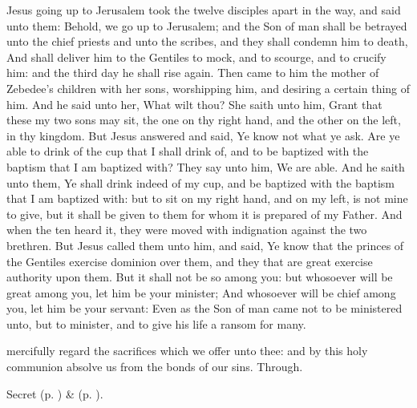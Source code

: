  Jesus going up to Jerusalem took the twelve disciples apart in the way, and said unto them: Behold, we go up to Jerusalem; and the Son of man shall be betrayed unto the chief priests and unto the scribes, and they shall condemn him to death, And shall deliver him to the Gentiles to mock, and to scourge, and to crucify him: and the third day he shall rise again. Then came to him the mother of Zebedee's children with her sons, worshipping him, and desiring a certain thing of him. And he said unto her, What wilt thou? She saith unto him, Grant that these my two sons may sit, the one on thy right hand, and the other on the left, in thy kingdom. But Jesus answered and said, Ye know not what ye ask. Are ye able to drink of the cup that I shall drink of, and to be baptized with the baptism that I am baptized with? They say unto him, We are able. And he saith unto them, Ye shall drink indeed of my cup, and be baptized with the baptism that I am baptized with: but to sit on my right hand, and on my left, is not mine to give, but it shall be given to them for whom it is prepared of my Father. And when the ten heard it, they were moved with indignation against the two brethren. But Jesus called them unto him, and said, Ye know that the princes of the Gentiles exercise dominion over them, and they that are great exercise authority upon them. But it shall not be so among you: but whosoever will be great among you, let him be your minister; And whosoever will be chief among you, let him be your servant: Even as the Son of man came not to be ministered unto, but to minister, and to give his life a ransom for many.


\secret
{} mercifully regard the sacrifices which we offer unto thee: and by this holy communion absolve us from the bonds of our sins. Through.


\begin{rubric}
     Secret  (p. \pageref{AshWednesdayMassSecret}) \&   (p. \pageref{SPLivingDeparted}).
\end{rubric}


